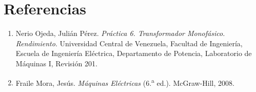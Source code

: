 \documentclass[12pt]{article}
\begin{document}
\newpage

\section{Referencias}
\begin{enumerate}
    \item Nerio Ojeda, Juli\'an P\'erez. \textit{Pr\'actica 6. Transformador Monof\'asico. Rendimiento}. Universidad Central de Venezuela, Facultad de Ingenier\'ia, Escuela de Ingenier\'ia El\'ectrica, Departamento de Potencia, Laboratorio de M\'aquinas I, Revisi\'on 201.
    \item Fraile Mora, Jes\'us. \textit{M\'aquinas El\'ectricas} (6.\textsuperscript{a} ed.). McGraw-Hill, 2008.
\end{enumerate}
\end{document}
